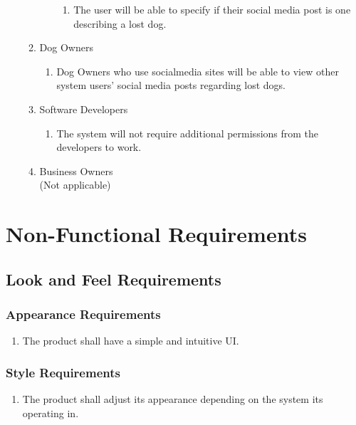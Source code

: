 \documentclass[]{article}
\begin{document}
\begin{enumerate}[{BE}1.]
\begin{enumerate}[{VP3}.1]
\begin{enumerate}
\begin{enumerate}[{ii}.i]
                \item The user will be able to specify if their social media post is one describing a lost dog.
            	\end{enumerate}
            \end{enumerate}
     	\item Dog Owners
        	\begin{enumerate}
            \item Dog Owners who use socialmedia sites will be able to view other system users' social media posts regarding lost dogs.
            \end{enumerate}
        \item Software Developers
        	\begin{enumerate}
            \item The system will not require additional permissions from the developers to work.
            \end{enumerate}
      	\item Business Owners\\(Not applicable)
        \end{enumerate}
\end{enumerate}




\section{Non-Functional Requirements}
\label{sec:non-functional_requirements}
\subsection{Look and Feel Requirements}
\label{sub:look_and_feel_requirements}

\subsubsection{Appearance Requirements}
\label{ssub:appearance_requirements}
\begin{enumerate}[{LF}1. ]
	\item The product shall have a simple and intuitive UI.
\end{enumerate}

\subsubsection{Style Requirements}
\label{ssub:style_requirements}
\begin{enumerate}[{LF}2. ]
	\item The product shall adjust its appearance depending on the system its operating in.
\end{enumerate}
\end{document}
